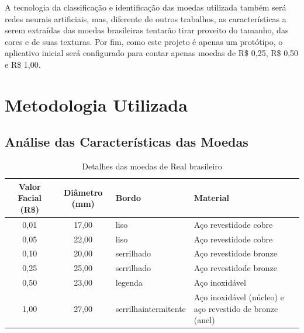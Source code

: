 \documentclass[10pt,journal,compsoc]{IEEEtran}
\begin{document}
A tecnologia da classificação e identificação das moedas utilizada também será redes neurais artificiais, mas, diferente de outros trabalhos, as características a serem extraídas das moedas brasileiras tentarão tirar proveito do tamanho, das cores e de suas texturas. Por fim, como este projeto é apenas um protótipo, o aplicativo inicial será configurado para contar apenas moedas de R\$ 0,25, R\$  0,50 e R\$ 1,00.

\section{Metodologia Utilizada}
\label{sec:metologia-utilizada}

\subsection{Análise das Características das Moedas}
\label{sec:metologia:analise-moedas}

\begin{table}[]
\centering
\caption{Detalhes das moedas de Real brasileiro}
\label{tab:moedas}
\begin{tabular}{@{}ccll@{}}
\toprule
\textbf{Valor Facial (R\$)} & \textbf{Diâmetro (mm)} & \multicolumn{1}{l}{\textbf{Bordo}} & \multicolumn{1}{l}{\textbf{Material}}                    \\ \midrule
0,01                        & 17,00                  & liso                               & Aço revestidode cobre                                    \\
0,05                        & 22,00                  & liso                               & Aço revestidode cobre                                    \\
0,10                        & 20,00                  & serrilhado                         & Aço revestidode bronze                                   \\
0,25                        & 25,00                  & serrilhado                         & Aço revestidode bronze                                   \\
0,50                        & 23,00                  & legenda                            & Aço inoxidável                                           \\
1,00                        & 27,00                  & serrilhaintermitente               & Aço inoxidável (núcleo) e aço revestido de bronze (anel) \\ \bottomrule
\end{tabular}
\end{table}
\end{document}
